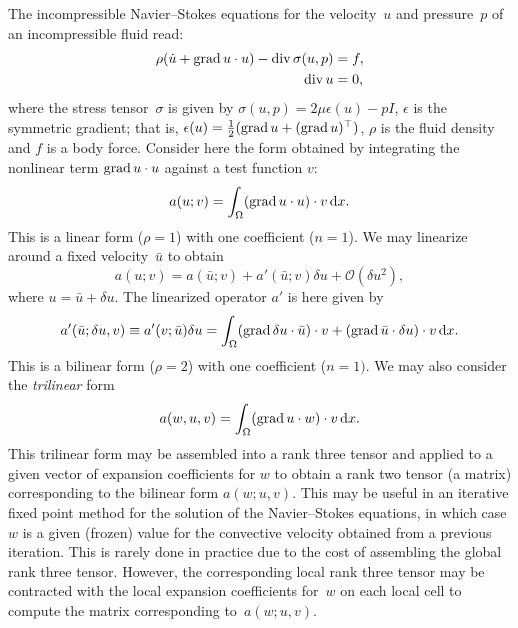 The incompressible Navier--Stokes equations for the velocity~$u$ and
pressure~$p$ of an incompressible fluid read:
\begin{equation}
  \begin{split}
    \rho(\dot{u} + \operatorname{grad} u \cdot u) - \operatorname{div} \sigma(u, p) &= f, \\
    \operatorname{div} u &= 0,
  \end{split}
\end{equation}
where the stress tensor~$\sigma$ is given by $\sigma(u, p) = 2 \mu
\epsilon(u) - p I$, $\epsilon$ is the symmetric gradient; that is,
$\epsilon(u) = \frac{1}{2}(\operatorname{grad} u + (\operatorname{grad} u)^{\top})$, $\rho$ is
the fluid density and $f$ is a body force.
Consider here the form obtained by
integrating the nonlinear term $\operatorname{grad} u \cdot u$ against a test
function $v$:
\begin{equation}
  a(u; v) = \int_{\Omega} (\operatorname{grad} u \cdot u) \cdot v \, \mathrm{d}x.
\end{equation}
This is a linear form ($\rho = 1$) with one coefficient ($n = 1$). We
may linearize around a fixed velocity~$\bar{u}$ to obtain
\begin{equation}
  a(u; v) = a(\bar{u}; v) + a'(\bar{u}; v) \delta u + \mathcal{O}(\delta u^2),
\end{equation}
where $u = \bar{u} + \delta u$. The linearized operator $a'$ is here
given by
\begin{equation}
  a'(\bar{u}; \delta u, v) \equiv a'(v; \bar{u}) \delta u =
  \int_{\Omega}
  (\operatorname{grad} \delta u \cdot \bar{u}) \cdot v +
  (\operatorname{grad} \bar{u} \cdot \delta u) \cdot v \, \mathrm{d}x.
\end{equation}
This is a bilinear form ($\rho = 2$) with one coefficient ($n = 1)$.
We may also consider the \emph{trilinear} form
\begin{equation}
  a(w, u, v) = \int_{\Omega} (\operatorname{grad} u \cdot w) \cdot v \, \mathrm{d}x.
\end{equation}
This trilinear form may be assembled into a rank three tensor and
applied to a given vector of expansion coefficients for $w$ to obtain
a rank two tensor (a matrix) corresponding to the bilinear form $a(w;
u, v)$. This may be useful in an iterative fixed point method for the
solution of the Navier--Stokes equations, in which case $w$ is a given
(frozen) value for the convective velocity obtained from a previous
iteration. This is rarely done in practice due to the cost of
assembling the global rank three tensor. However, the corresponding
local rank three tensor may be contracted with the local expansion
coefficients for~$w$ on each local cell to compute the matrix
corresponding to~$a(w; u, v)$.

